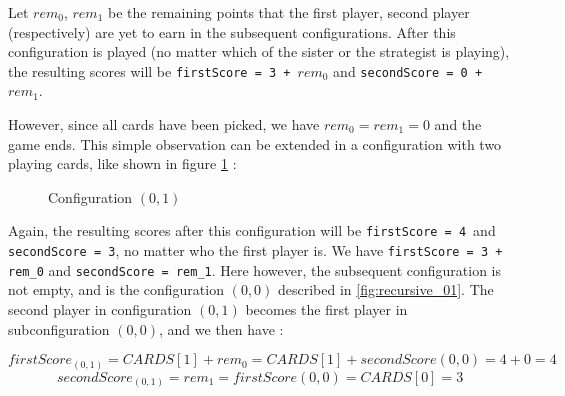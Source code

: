 \documentclass[a4paper,12pt,fleqn]{article}
\begin{document}
Let $rem_0$, $rem_1$ be the remaining points that the first player, second player (respectively) are yet to earn in the subsequent configurations.
After this configuration is played (no matter which of the sister or the strategist is playing), the resulting scores will be \texttt{firstScore = 3 + $rem_0$} and \texttt{secondScore = 0 + $rem_1$}.

However, since all cards have been picked, we have $rem_0 = rem_1 = 0$ and the game ends. This simple observation can be extended in a configuration with two playing cards, like shown in figure \ref{fig:recursive_02} :

\begin{figure}[H]
    \centering
    \caption{Configuration $(0,1)$}
    \label{fig:recursive_02}
\end{figure}

Again, the resulting scores after this configuration will be \texttt{firstScore = 4}\ and \texttt{secondScore = 3}, no matter who the first player is.
We have \texttt{firstScore = 3 + rem\_0} and \texttt{secondScore = rem\_1}. Here however, the subsequent configuration is not empty, and is the configuration $(0,0)$ described in \ref{fig:recursive_01}.
The second player in configuration $(0,1)$ becomes the first player in subconfiguration $(0,0)$, and we then have :

$$firstScore_{(0,1)} = CARDS[1] + rem_0 = CARDS[1] + secondScore{(0,0)} = 4 + 0 = 4$$
$$secondScore_{(0,1)} = rem_1 = firstScore{(0,0)} = CARDS[0] = 3$$
\end{document}
